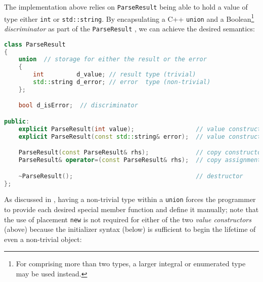 \noindent The implementation above relies on \lstinline!ParseResult! being able to
hold a value of type either \lstinline!int! or \lstinline!std::string!. By
encapsulating a C++ \lstinline!union! and a Boolean{\cprotect\footnote{For
 comprising more than two types, a larger integral
  or enumerated type may be used instead.}} \emph{discriminator} as part
of the \lstinline!ParseResult! , we can achieve the
desired semantics:

%
%
%
%
\begin{lstlisting}[language=C++]
class ParseResult
{
    union  // storage for either the result or the error
    {
        int         d_value; // result type (trivial)
        std::string d_error; // error  type (non-trivial)
    };

    bool d_isError;  // discriminator

public:
    explicit ParseResult(int value);                 // value constructor (1)
    explicit ParseResult(const std::string& error);  // value constructor (2)

    ParseResult(const ParseResult& rhs);             // copy constructor
    ParseResult& operator=(const ParseResult& rhs);  // copy assignment

    ~ParseResult();                                  // destructor
};
\end{lstlisting}

    
\noindent As discussed in 
, having a non-trivial
type within a \lstinline!union! forces the programmer to provide each
desired special member function and define it manually; note 
that the use of placement \lstinline!new! is not required for either of the
two \emph{value constructors} (above) because the initializer syntax
(below) is sufficient to begin the lifetime of even a non-trivial
object:

